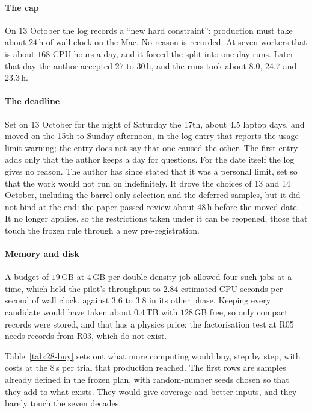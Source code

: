 \paragraph{The cap}
On 13 October the log records a ``new hard constraint'': production must take about $24$\,h of wall clock on the Mac. No reason is recorded. At seven workers that is about $168$ CPU-hours a day, and it forced the split into one-day runs. Later that day the author accepted $27$ to $30$\,h, and the runs took about $8.0$, $24.7$ and $23.3$\,h.

\paragraph{The deadline}
Set on 13 October for the night of Saturday the 17th, about $4.5$ laptop days, and moved on the 15th to Sunday afternoon, in the log entry that reports the usage-limit warning; the entry does not say that one caused the other. The first entry adds only that the author keeps a day for questions. For the date itself the log gives no reason. The author has since stated that it was a personal limit, set so that the work would not run on indefinitely. It drove the choices of 13 and 14 October, including the barrel-only selection and the deferred samples, but it did not bind at the end: the paper passed review about $48$\,h before the moved date. It no longer applies, so the restrictions taken under it can be reopened, those that touch the frozen rule through a new pre-registration.

\paragraph{Memory and disk}
A budget of $19$\,GB at $4$\,GB per double-density job allowed four such jobs at a time, which held the pilot's throughput to $2.84$ estimated CPU-seconds per second of wall clock, against $3.6$ to $3.8$ in its other phase. Keeping every candidate would have taken about $0.4$\,TB with $128$\,GB free, so only compact records were stored, and that has a physics price: the factorisation test at R05 needs records from R03, which do not exist.

\medskip
Table~\ref{tab:28-buy} sets out what more computing would buy, step by step, with costs at the $8$\,s per trial that production reached. The first rows are samples already defined in the frozen plan, with random-number seeds chosen so that they add to what exists. They would give coverage and better inputs, and they barely touch the seven decades.

